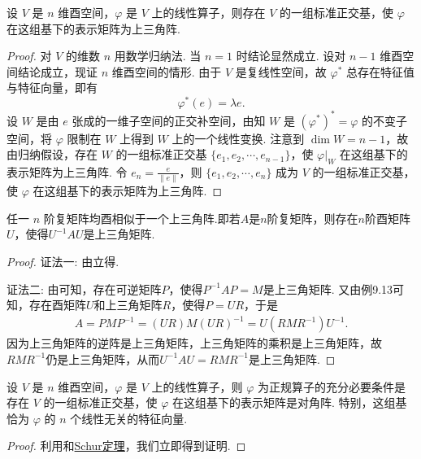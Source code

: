 \documentclass[../../main.tex]{subfiles}
\begin{document}
\begin{theorem}[Schur(舒尔)定理]\label{theorem:Schur(舒尔)定理}
设 $V$ 是 $n$ 维酉空间，$\varphi$ 是 $V$ 上的线性算子，则存在 $V$ 的一组标准正交基，使 $\varphi$ 在这组基下的表示矩阵为上三角阵.
\end{theorem}
\begin{proof}
对 $V$ 的维数 $n$ 用数学归纳法. 当 $n = 1$ 时结论显然成立. 设对 $n - 1$ 维酉空间结论成立，现证 $n$ 维酉空间的情形. 由于 $V$ 是复线性空间，故 $\varphi^*$ 总存在特征值与特征向量，即有
\[
\varphi^*(e) = \lambda e.
\]
设 $W$ 是由 $e$ 张成的一维子空间的正交补空间，由知 $W$ 是 $(\varphi^*)^* = \varphi$ 的不变子空间，将 $\varphi$ 限制在 $W$ 上得到 $W$ 上的一个线性变换. 注意到 $\dim W = n - 1$，故由归纳假设，存在 $W$ 的一组标准正交基 $\{e_1,e_2,\cdots,e_{n - 1}\}$，使 $\varphi|_W$ 在这组基下的表示矩阵为上三角阵. 令 $e_n = \frac{e}{\|e\|}$，则 $\{e_1,e_2,\cdots,e_n\}$ 成为 $V$ 的一组标准正交基，使 $\varphi$ 在这组基下的表示矩阵为上三角阵.
\end{proof}

\begin{corollary}[Schur定理]\label{corollary:Schur(舒尔)定理}
任一 $n$ 阶复矩阵均酉相似于一个上三角阵.即若\(A\)是\(n\)阶复矩阵，则存在\(n\)阶酉矩阵\(U\)，使得\(U^{-1}AU\)是上三角矩阵.
\end{corollary}
\begin{proof}
{\color{blue}证法一:}
由立得.

{\color{blue}证法二:}
由可知，存在可逆矩阵\(P\)，使得\(P^{-1}AP = M\)是上三角矩阵. 又由例9.13可知，存在酉矩阵\(U\)和上三角矩阵\(R\)，使得\(P = UR\)，于是
\begin{align*}
A = PMP^{-1}=(UR)M(UR)^{-1}=U(RMR^{-1})U^{-1}.
\end{align*}
因为上三角矩阵的逆阵是上三角矩阵，上三角矩阵的乘积是上三角矩阵，故\(RMR^{-1}\)仍是上三角矩阵，从而\(U^{-1}AU = RMR^{-1}\)是上三角矩阵. 
\end{proof}

\begin{theorem}
设 $V$ 是 $n$ 维酉空间，$\varphi$ 是 $V$ 上的线性算子，则 $\varphi$ 为正规算子的充分必要条件是存在 $V$ 的一组标准正交基，使 $\varphi$ 在这组基下的表示矩阵是对角阵. 特别，这组基恰为 $\varphi$ 的 $n$ 个线性无关的特征向量.
\end{theorem}
\begin{proof}
利用和\hyperref[corollary:Schur(舒尔)定理]{Schur定理}，我们立即得到证明.
\end{proof}
\end{document}
